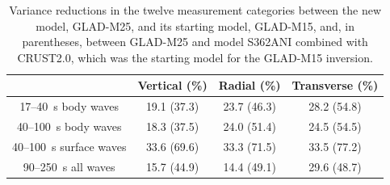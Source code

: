\documentclass[extra,mreferee]{gji}
\begin{document}
\begin{table}
  \centering
  \begin{tabular}{|c|c|c|c|}
    \hline
    ~          &  Vertical (\%) & Radial (\%) &  Transverse (\%) \\
    \hline
    17--40~s  body waves    &   19.1 (37.3)   &       23.7 (46.3) &       28.2 (54.8) \\
    40--100~s body waves    &   18.3 (37.5)   &       24.0 (51.4) &       24.5 (54.5) \\
    40--100~s surface waves &   33.6 (69.6)   &       33.3 (71.5) &       33.5 (77.2) \\
    90--250~s all waves &   15.7 (44.9)   &       14.4 (49.1) &       29.6 (48.7) \\
    \hline
  \end{tabular}\\
  \caption{\small{Variance reductions in the twelve measurement categories
  between the new model, GLAD-M25, and its starting model, GLAD-M15,
  and, in parentheses, between GLAD-M25 and model S362ANI combined with
  CRUST2.0, which was the starting model for the GLAD-M15 inversion.}}
  \label{table:misfit_reduction_M15_M25}
\end{table}

\end{document}
